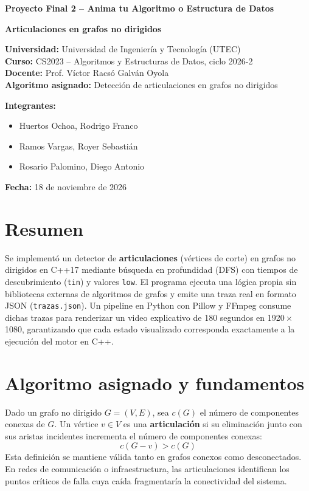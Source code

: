 \documentclass[11pt,a4paper]{article}
\begin{document}
\thispagestyle{fancy}

\vspace*{1.5cm}
\begin{center}
  {\LARGE\bfseries\color{navy} Proyecto Final 2 -- Anima tu Algoritmo o Estructura de Datos\par}
  \vspace{0.8cm}
  {\Large\bfseries\color{teal} Articulaciones en grafos no dirigidos\par}
\end{center}
\vspace{1.3cm}

\textbf{Universidad:} Universidad de Ingeniería y Tecnología (UTEC)\\[0.25em]
\textbf{Curso:} CS2023 -- Algoritmos y Estructuras de Datos, ciclo 2026-2\\[0.25em]
\textbf{Docente:} Prof. Víctor Racsó Galván Oyola\\[0.25em]
\textbf{Algoritmo asignado:} Detección de articulaciones en grafos no dirigidos

\vspace{0.7cm}
\textbf{Integrantes:}
\begin{itemize}
  \item Huertos Ochoa, Rodrigo Franco
  \item Ramos Vargas, Royer Sebastián
  \item Rosario Palomino, Diego Antonio
\end{itemize}

\vspace{0.5cm}
\textbf{Fecha:} 18 de noviembre de 2026

\newpage

\section*{Resumen}
Se implementó un detector de \textbf{articulaciones} (vértices de corte) en
grafos no dirigidos en C++17 mediante búsqueda en profundidad (DFS) con tiempos
de descubrimiento (\texttt{tin}) y valores \texttt{low}. El programa ejecuta
una lógica propia sin bibliotecas externas de algoritmos de grafos y emite una
traza real en formato JSON (\texttt{trazas.json}). Un pipeline en Python con
Pillow y FFmpeg consume dichas trazas para renderizar un video explicativo de
180 segundos en 1920\,$\times$\,1080, garantizando que cada estado visualizado
corresponda exactamente a la ejecución del motor en C++.

\section{Algoritmo asignado y fundamentos}
Dado un grafo no dirigido $G=(V,E)$, sea $c(G)$ el número de componentes
conexas de $G$. Un vértice $v \in V$ es una \textbf{articulación} si su
eliminación junto con sus aristas incidentes incrementa el número de
componentes conexas:
\[
  c(G - v) > c(G)
\]
Esta definición se mantiene válida tanto en grafos conexos como desconectados.
En redes de comunicación o infraestructura, las articulaciones identifican los
puntos críticos de falla cuya caída fragmentaría la conectividad del sistema.
\end{document}

